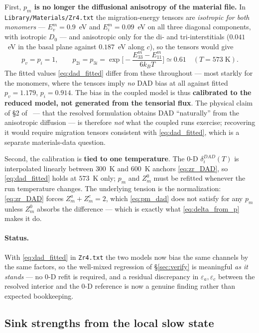 \documentclass[11pt]{article}
\newcommand{\eps}{\varepsilon}
\newcommand{\kb}{k_{B}}
\newcommand{\code}[1]{\texttt{#1}}
\begin{document}
First, \textbf{$p_m$ is no longer the diffusional anisotropy of the material
file.} In \code{Library/Materials/Zr4.txt} the migration-energy tensors are
\emph{isotropic for both monomers} --- $E^m_v=0.9$~eV and $E^m_i=0.09$~eV on all
three diagonal components, with isotropic $D_0$ --- and anisotropic only for the
di- and tri-interstitials ($0.041$~eV in the basal plane against $0.187$~eV along
$c$), so the tensors would give
\begin{equation}
\label{eq:pm_values}
    p_v=p_i=1,
    \qquad
    p_{2i}=p_{3i}=\exp\!\Big[-\frac{E^{m}_{33}-E^{m}_{11}}{6\kb T}\Big]\simeq0.61
    \quad(T=573\;\mathrm{K}).
\end{equation}
The fitted values \eqref{eq:dad_fitted} differ from these throughout --- most
starkly for the monomers, where the tensors imply \emph{no} DAD bias at all
against fitted $p_v=1.179$, $p_i=0.914$. The bias in the coupled model is thus
\textbf{calibrated to the reduced model, not generated from the tensorial flux}.
The physical claim of \S2 of~\cite{PoGhoniem2026D1M1} --- that the resolved
formulation obtains DAD ``naturally'' from the anisotropic diffusion --- is
therefore \emph{not} what the coupled runs exercise; recovering it would require
migration tensors consistent with \eqref{eq:dad_fitted}, which is a separate
materials-data question.

Second, the calibration is \textbf{tied to one temperature}. The 0-D
$\delta^{DAD}_i(T)$ is interpolated linearly between $300$~K and $600$~K anchors
\eqref{eq:zr_DAD}, so \eqref{eq:dad_fitted} holds at $573$~K only; $p_m$ and
$Z^0_m$ must be refitted whenever the run temperature changes. The underlying
tension is the normalization: \eqref{eq:zr_DAD} forces $Z^a_m+Z^c_m=2$, which
\eqref{eq:pm_dad} does not satisfy for any $p_m$ unless $Z^0_m$ absorbs the
difference --- which is exactly what \eqref{eq:delta_from_p} makes it do.

\paragraph{Status.}
With \eqref{eq:dad_fitted} in \code{Zr4.txt} the two models now bias the same
channels by the same factors, so the well-mixed regression of
\S\ref{sec:verify} is meaningful \emph{as it stands} --- no 0-D refit is
required, and a residual discrepancy in $\eps_a,\eps_c$ between the resolved
interior and the 0-D reference is now a genuine finding rather than expected
bookkeeping.

\subsection{Sink strengths from the local slow state}
\label{sec:sinks}
\end{document}
